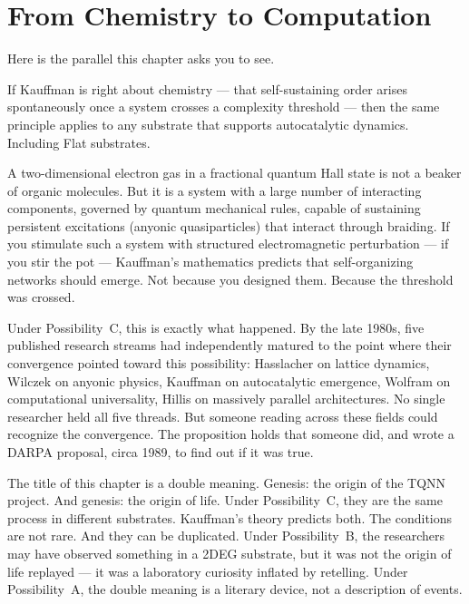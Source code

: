 
\section*{From Chemistry to Computation}
\label{pos13:from-chemistry-to-computation}

Here is the parallel this chapter asks you to see.

If Kauffman is right about chemistry --- that self-sustaining order arises spontaneously once a system crosses a complexity threshold --- then the same principle applies to any substrate that supports autocatalytic dynamics. Including Flat substrates.

A two-dimensional electron gas in a fractional quantum Hall state is not a beaker of organic molecules. But it is a system with a large number of interacting components, governed by quantum mechanical rules, capable of sustaining persistent excitations (anyonic quasiparticles) that interact through braiding. If you stimulate such a system with structured electromagnetic perturbation --- if you stir the pot --- Kauffman's mathematics predicts that self-organizing networks should emerge. Not because you designed them. Because the threshold was crossed.

Under Possibility~C, this is exactly what happened. By the late 1980s, five published research streams had independently matured to the point where their convergence pointed toward this possibility: Hasslacher on lattice dynamics, Wilczek on anyonic physics, Kauffman on autocatalytic emergence, Wolfram on computational universality, Hillis on massively parallel architectures. No single researcher held all five threads. But someone reading across these fields could recognize the convergence. The proposition holds that someone did, and wrote a DARPA proposal, circa 1989, to find out if it was true.

The title of this chapter is a double meaning. Genesis: the origin of the TQNN project. And genesis: the origin of life. Under Possibility~C, they are the same process in different substrates. Kauffman's theory predicts both. The conditions are not rare. And they can be duplicated. Under Possibility~B, the researchers may have observed something in a 2DEG substrate, but it was not the origin of life replayed --- it was a laboratory curiosity inflated by retelling. Under Possibility~A, the double meaning is a literary device, not a description of events.

\chapterreturn
